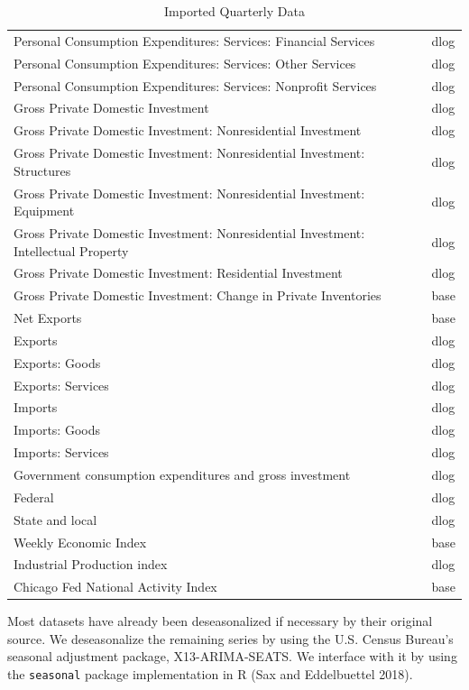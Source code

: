 \documentclass[11pt, letterpaper]{article}\usepackage[]{graphicx}\usepackage[]{color}
\begin{document}
\begin{table}[!h]
\begin{tabular}{ll}
  Personal Consumption Expenditures: Services: Financial Services & dlog \\ 
  Personal Consumption Expenditures: Services: Other Services & dlog \\ 
  Personal Consumption Expenditures: Services: Nonprofit Services & dlog \\ 
  Gross Private Domestic Investment & dlog \\ 
  Gross Private Domestic Investment: Nonresidential Investment & dlog \\ 
  Gross Private Domestic Investment: Nonresidential Investment: Structures & dlog \\ 
  Gross Private Domestic Investment: Nonresidential Investment: Equipment & dlog \\ 
  Gross Private Domestic Investment: Nonresidential Investment: Intellectual Property & dlog \\ 
  Gross Private Domestic Investment: Residential Investment & dlog \\ 
  Gross Private Domestic Investment: Change in Private Inventories & base \\ 
  Net Exports & base \\ 
  Exports & dlog \\ 
  Exports: Goods & dlog \\ 
  Exports: Services & dlog \\ 
  Imports & dlog \\ 
  Imports: Goods & dlog \\ 
  Imports: Services & dlog \\ 
  Government consumption expenditures and gross investment & dlog \\ 
  Federal & dlog \\ 
  State and local & dlog \\ 
  Weekly Economic Index & base \\ 
  Industrial Production index & dlog \\ 
  Chicago Fed National Activity Index & base \\ 
   \hline
\end{tabular}
\endgroup
\caption{Imported Quarterly Data} 
\end{table}


Most datasets have already been deseasonalized if necessary by their original source. We deseasonalize the remaining series by using the U.S. Census Bureau's seasonal adjustment package, X13-ARIMA-SEATS. We interface with it by using the \texttt{seasonal} package implementation in R (Sax and Eddelbuettel 2018).
\end{document}
